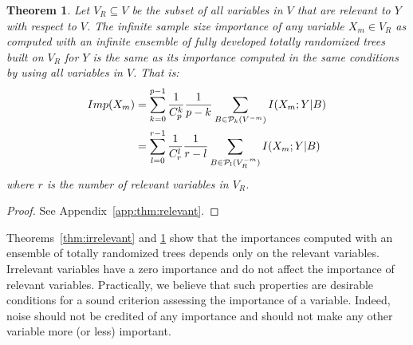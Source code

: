 \documentclass{article}
\newtheorem{theorem}{Theorem}
\begin{document}
\begin{theorem}\label{thm:relevant}
  Let $V_R \subseteq V$ be the subset of all variables in $V$ that are relevant to $Y$ with
  respect to $V$. The infinite sample size importance of any variable $X_m \in
  V_R$ as computed with an infinite ensemble of fully developed totally randomized
  trees built on $V_R$ for $Y$ is the same as its importance computed in the same conditions by using all variables in $V$. That is:
    \begin{equation}
      \begin{aligned}
      Imp(X_m)&=\sum_{k=0}^{p-1} \frac{1}{C_p^k} \frac{1}{p-k} \sum_{B \in {\cal P}_k(V^{-m})} I(X_m;Y|B)\\
              &=\sum_{l=0}^{r-1} \frac{1}{C_r^l} \frac{1}{r-l} \sum_{B \in {\cal P}_l(V_R^{-m})} I(X_m;Y|B)\\
      \end{aligned}
    \end{equation}
  where $r$ is the number of relevant variables in $V_R$.
\end{theorem}


\begin{proof}
See Appendix~\ref{app:thm:relevant}.
\end{proof}

Theorems~\ref{thm:irrelevant} and \ref{thm:relevant} show that the
importances computed with an ensemble of totally randomized trees depends only
on the relevant variables. Irrelevant variables have a zero importance and do
not affect the importance of relevant variables. Practically, we believe that
such properties are desirable conditions for a sound criterion assessing the
importance of a variable. Indeed, noise should not be credited of any importance
and should not make any other variable more (or less) important.

\end{document}
